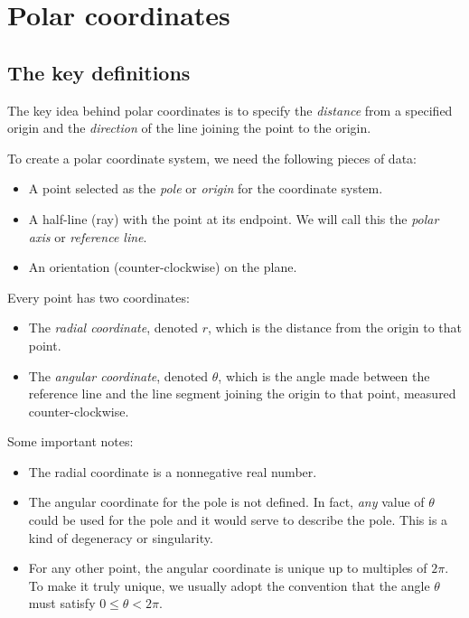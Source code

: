 \documentclass[10pt]{amsart}
\begin{document}
\section{Polar coordinates}

\subsection{The key definitions}

The key idea behind polar coordinates is to specify the {\em distance}
from a specified origin and the {\em direction} of the line joining
the point to the origin.

To create a polar coordinate system, we need the following pieces of data:

\begin{itemize}
\item A point selected as the {\em pole} or {\em origin} for the
  coordinate system.
\item A half-line (ray) with the point at its endpoint. We will call
  this the {\em polar axis} or {\em reference line}.
\item An orientation (counter-clockwise) on the plane.
\end{itemize}

Every point has two coordinates:

\begin{itemize}
\item The {\em radial coordinate}, denoted $r$, which is the distance
  from the origin to that point.
\item The {\em angular coordinate}, denoted $\theta$, which is the
  angle made between the reference line and the line segment joining the
  origin to that point, measured counter-clockwise.
\end{itemize}

Some important notes:

\begin{itemize}
\item The radial coordinate is a nonnegative real number.
\item The angular coordinate for the pole is not defined. In fact,
  {\em any} value of $\theta$ could be used for the pole and it would
  serve to describe the pole. This is a kind of degeneracy or
  singularity.
\item For any other point, the angular coordinate is unique up to
  multiples of $2\pi$. To make it truly unique, we usually adopt the
  convention that the angle $\theta$ must satisfy $0 \le \theta <
  2\pi$.
\end{itemize}
\end{document}

